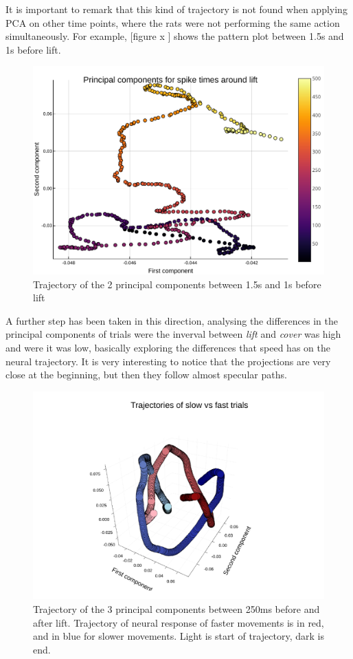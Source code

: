 It is important to remark that this kind of trajectory is not found when applying PCA on other time points, where the rats were not performing the same action simultaneously. For example, [figure x ] shows the pattern plot between 1.5s and 1s before lift.
\begin{figure}[h!]
	\centering
	\includegraphics[scale=0.8]{../../plots/pca-500-before-lift.pdf}
	\caption{Trajectory of the 2 principal components between 1.5s and 1s before lift}
	\label{fig:pca-500-before-lift}
\end{figure}


A further step has been taken in this direction, analysing the differences in the principal components of trials were the inverval between \emph{lift} and \emph{cover} was high and were it was low, basically exploring the differences that speed has on the neural trajectory.
It is very interesting to notice that the projections are very close at the beginning, but then they follow almost specular paths.

\begin{figure}[h!]
	\centering
	\includegraphics[scale=0.8]{../../plots/pca-speed.pdf}
	\caption{Trajectory of the 3 principal components  between 250ms before and after lift. Trajectory of neural response of faster movements is in red, and in blue for slower movements. Light is start of trajectory, dark is end.}
	\label{fig:pca-speed}
\end{figure}

